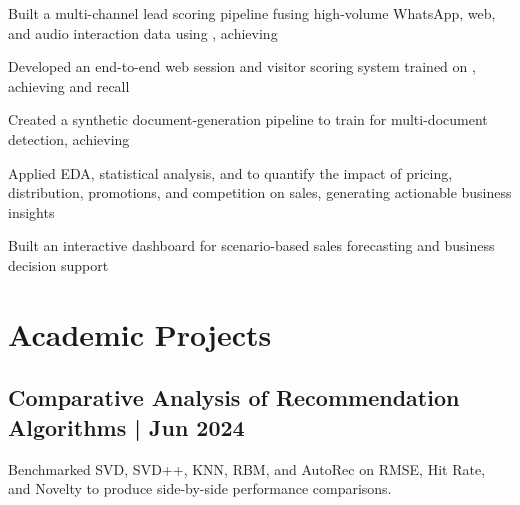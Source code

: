 \documentclass[]{deedy-resume-openfont}
\begin{document}
\begin{minipage}[t]{0.66\textwidth}
\vspace{3.5pt}\noindent{}\par\vspace{1.5pt}
\begin{tightemize}
\item Built a multi-channel lead scoring pipeline fusing high-volume WhatsApp, web, and audio interaction data using , achieving 
\item Developed an end-to-end web session and visitor scoring system trained on , achieving  and  recall
\end{tightemize}

\vspace{3.5pt}\noindent{}\par\vspace{1.5pt}
\begin{tightemize}
\item Created a synthetic document-generation pipeline to train  for multi-document detection, achieving 
\end{tightemize}
\sectionsep

\begin{tightemize}
\item Applied EDA, statistical analysis, and  to quantify the impact of pricing, distribution, promotions, and competition on sales, generating actionable business insights
\item Built an interactive  dashboard for scenario-based sales forecasting and business decision support
\end{tightemize}
\sectionsep

\section{Academic Projects}

\subsection{Comparative Analysis of Recommendation Algorithms | Jun 2024}
Benchmarked SVD, SVD++, KNN, RBM, and AutoRec on RMSE, Hit Rate, and Novelty to produce side-by-side performance comparisons.
\sectionsep


\end{minipage}
\end{document}
